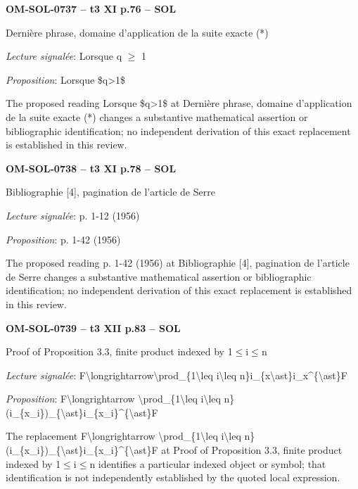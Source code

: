 \par\noindent\textbf{OM-SOL-0737 -- t3 XI p.76 -- SOL}\par
Dernière phrase, domaine d'application de la suite exacte (*)\par
\emph{Lecture signalée}: Lorsque q \ensuremath{\geq} 1\par
\emph{Proposition}: Lorsque \$q>1\$\par
The proposed reading Lorsque \$q>1\$ at Dernière phrase, domaine d'application de la suite exacte (*) changes a substantive mathematical assertion or bibliographic identification; no independent derivation of this exact replacement is established in this review.\par
\par\noindent\textbf{OM-SOL-0738 -- t3 XI p.78 -- SOL}\par
Bibliographie [4], pagination de l'article de Serre\par
\emph{Lecture signalée}: p. 1-12 (1956)\par
\emph{Proposition}: p. 1-42 (1956)\par
The proposed reading p. 1-42 (1956) at Bibliographie [4], pagination de l'article de Serre changes a substantive mathematical assertion or bibliographic identification; no independent derivation of this exact replacement is established in this review.\par
\par\noindent\textbf{OM-SOL-0739 -- t3 XII p.83 -- SOL}\par
Proof of Proposition 3.3, finite product indexed by 1\ensuremath{\leq}i\ensuremath{\leq}n\par
\emph{Lecture signalée}: F\textbackslash{}longrightarrow\textbackslash{}prod\_\{1\textbackslash{}leq i\textbackslash{}leq n\}i\_\{x\textbackslash{}ast\}i\_x\textasciicircum{}\{\textbackslash{}ast\}F\par
\emph{Proposition}: F\textbackslash{}longrightarrow \textbackslash{}prod\_\{1\textbackslash{}leq i\textbackslash{}leq n\}(i\_\{x\_i\})\_\{\textbackslash{}ast\}i\_\{x\_i\}\textasciicircum{}\{\textbackslash{}ast\}F\par
The replacement F\textbackslash{}longrightarrow \textbackslash{}prod\_\{1\textbackslash{}leq i\textbackslash{}leq n\}(i\_\{x\_i\})\_\{\textbackslash{}ast\}i\_\{x\_i\}\textasciicircum{}\{\textbackslash{}ast\}F at Proof of Proposition 3.3, finite product indexed by 1\ensuremath{\leq}i\ensuremath{\leq}n identifies a particular indexed object or symbol; that identification is not independently established by the quoted local expression.\par
